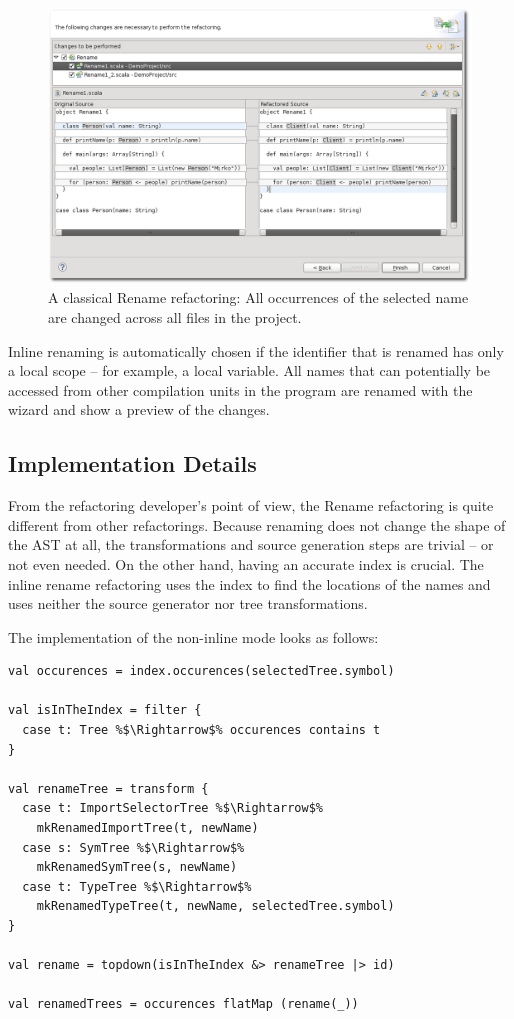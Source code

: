 \documentclass[10pt,a4paper,oneside]{scrreprt}
\begin{document}
\begin{figure}
  \centering
  \includegraphics[width=\linewidth]{rename_screenshot_2.png}
  \caption{A classical Rename refactoring: All occurrences of the selected name are changed across all files in the project.}
  \label{figure:rename-screenshot-2}
\end{figure}

Inline renaming is automatically chosen if the identifier that is renamed has only a local scope -- for example, a local variable. All names that can potentially be accessed from other compilation units in the program are renamed with the wizard and show a preview of the changes.

\subsection{Implementation Details}

From the refactoring developer's point of view, the Rename refactoring is quite different from other refactorings. Because renaming does not change the shape of the AST at all, the transformations and source generation steps are trivial -- or not even needed. On the other hand, having an accurate index is crucial. The inline rename refactoring uses the index to find the locations of the names and uses neither the source generator nor tree transformations.

The implementation of the non-inline mode looks as follows:

\begin{lstlisting}
val occurences = index.occurences(selectedTree.symbol) 
    
val isInTheIndex = filter {
  case t: Tree %$\Rightarrow$% occurences contains t 
}

val renameTree = transform {
  case t: ImportSelectorTree %$\Rightarrow$% 
    mkRenamedImportTree(t, newName)
  case s: SymTree %$\Rightarrow$% 
    mkRenamedSymTree(s, newName)
  case t: TypeTree %$\Rightarrow$% 
    mkRenamedTypeTree(t, newName, selectedTree.symbol)
}

val rename = topdown(isInTheIndex &> renameTree |> id)

val renamedTrees = occurences flatMap (rename(_))
\end{lstlisting}
\end{document}
